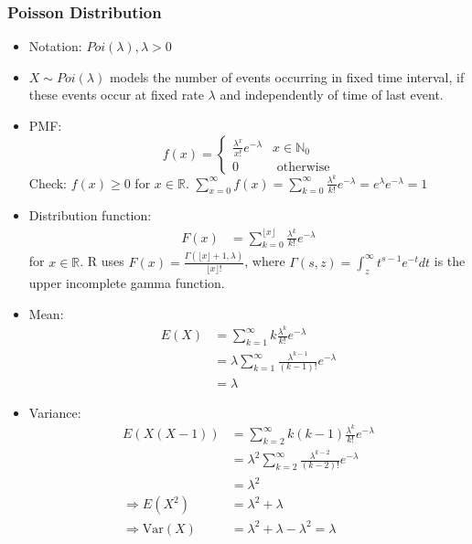 \documentclass{article}
\newcommand{\R}{\mathbb{R}}
\newcommand{\N}{\mathbb{N}}
\newcommand{\Var}{\mathrm{Var}}
\begin{document}
		\subsubsection{Poisson Distribution}
		\begin{itemize}
			\item Notation: $Poi(\lambda), \lambda>0$
			\item $X\sim Poi(\lambda)$ models the number of events occurring in fixed time interval, if these events occur at fixed rate $\lambda$ and independently of time of last event.
			\item PMF: \[f(x)=\begin{cases}
								\frac{\lambda^x}{x!}e^{-\lambda}&x\in\N_0\\
								0&\mbox{ otherwise}
								\end{cases}\]
			Check: $f(x)\geq0$ for $x\in\R$. $\sum_{x=0}^{\infty}f(x)=\sum_{k=0}^{\infty}\frac{\lambda^k}{k!}e^{-\lambda}=e^{\lambda}e^{-\lambda}=1$
			\item Distribution function:
					\begin{align*}
						F(x)&=\sum_{k=0}^{\lfloor x\rfloor}\frac{\lambda^k}{k!}e^{-\lambda}
					\end{align*}
					for $x\in\R$. R uses $F(x)=\frac{\Gamma(\lfloor x\rfloor+1, \lambda)}{\lfloor x\rfloor!}$, where $\Gamma(s, z)=\int_{z}^{\infty}t^{s-1}e^{-t}dt$ is the upper incomplete gamma function.
			\item Mean:
					\begin{align*}
						E(X)&=\sum_{k=1}^{\infty}k\frac{\lambda^k}{k!}e^{-\lambda}\\
						&=\lambda\sum_{k=1}^{\infty}\frac{\lambda^{k-1}}{(k-1)!}e^{-\lambda}\\
						&=\lambda
					\end{align*}
			\item Variance:
					\begin{align*}
						E(X(X-1))&=\sum_{k=2}^{\infty}k(k-1)\frac{\lambda^k}{k!}e^{-\lambda}\\
						&=\lambda^2\sum_{k=2}^{\infty}\frac{\lambda^{k-2}}{(k-2)!}e^{-\lambda}\\
						&=\lambda^2\\
						\Rightarrow E(X^2)&=\lambda^2+\lambda\\
						\Rightarrow\Var(X)&=\lambda^2+\lambda-\lambda^2=\lambda
					\end{align*}
					\begin{myrem*}{}{}
						\begin{enumerate}

\end{enumerate}
\end{myrem*}
\end{itemize}
\end{document}
